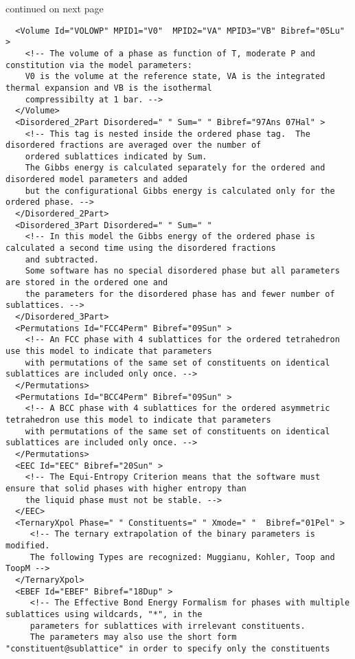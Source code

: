 \documentclass{article}
\begin{document}
\begin{appendices}
\bigskip
continued on next page

\newpage
{\small
\begin{verbatim}
  <Volume Id="VOLOWP" MPID1="V0"  MPID2="VA" MPID3="VB" Bibref="05Lu" > 
    <!-- The volume of a phase as function of T, moderate P and constitution via the model parameters:
    V0 is the volume at the reference state, VA is the integrated thermal expansion and VB is the isothermal
    compressibilty at 1 bar. -->
  </Volume>
  <Disordered_2Part Disordered=" " Sum=" " Bibref="97Ans 07Hal" > 
    <!-- This tag is nested inside the ordered phase tag.  The disordered fractions are averaged over the number of
    ordered sublattices indicated by Sum.
    The Gibbs energy is calculated separately for the ordered and disordered model parameters and added 
    but the configurational Gibbs energy is calculated only for the ordered phase. -->
  </Disordered_2Part>
  <Disordered_3Part Disordered=" " Sum=" "
    <!-- In this model the Gibbs energy of the ordered phase is calculated a second time using the disordered fractions
    and subtracted.
    Some software has no special disordered phase but all parameters are stored in the ordered one and
    the parameters for the disordered phase has and fewer number of sublattices. -->
  </Disordered_3Part>
  <Permutations Id="FCC4Perm" Bibref="09Sun" > 
    <!-- An FCC phase with 4 sublattices for the ordered tetrahedron use this model to indicate that parameters 
    with permutations of the same set of constituents on identical sublattices are included only once. -->
  </Permutations>
  <Permutations Id="BCC4Perm" Bibref="09Sun" > 
    <!-- A BCC phase with 4 sublattices for the ordered asymmetric tetrahedron use this model to indicate that parameters 
    with permutations of the same set of constituents on identical sublattices are included only once. -->
  </Permutations>
  <EEC Id="EEC" Bibref="20Sun" > 
    <!-- The Equi-Entropy Criterion means that the software must ensure that solid phases with higher entropy than
    the liquid phase must not be stable. -->
  </EEC>
  <TernaryXpol Phase=" " Constituents=" " Xmode=" "  Bibref="01Pel" > 
     <!-- The ternary extrapolation of the binary parameters is modified.
     The following Types are recognized: Muggianu, Kohler, Toop and ToopM -->
  </TernaryXpol>
  <EBEF Id="EBEF" Bibref="18Dup" > 
     <!-- The Effective Bond Energy Formalism for phases with multiple sublattices using wildcards, "*", in the
     parameters for sublattices with irrelevant constituents.
     The parameters may also use the short form "constituent@sublattice" in order to specify only the constituents

\end{verbatim}}
\end{appendices}
\end{document}

